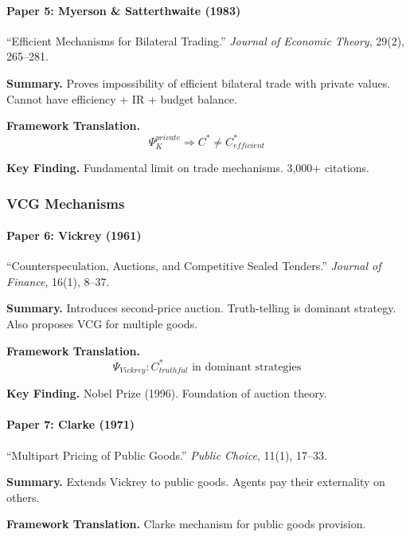 \paragraph{Paper 5: Myerson \& Satterthwaite (1983)}

``Efficient Mechanisms for Bilateral Trading.''
\textit{Journal of Economic Theory}, 29(2), 265--281.

\textbf{Summary.}
Proves impossibility of efficient bilateral trade with private values.
Cannot have efficiency + IR + budget balance.

\textbf{Framework Translation.}
\begin{equation}
\Psi_K^{private} \Rightarrow C^* \neq C^*_{efficient}
\end{equation}

\textbf{Key Finding.}
Fundamental limit on trade mechanisms. 3,000+ citations.

\subsubsection{VCG Mechanisms}

\paragraph{Paper 6: Vickrey (1961)}

``Counterspeculation, Auctions, and Competitive Sealed Tenders.''
\textit{Journal of Finance}, 16(1), 8--37.

\textbf{Summary.}
Introduces second-price auction. Truth-telling is dominant strategy.
Also proposes VCG for multiple goods.

\textbf{Framework Translation.}
\begin{equation}
\Psi_{Vickrey}: C^*_{truthful} \text{ in dominant strategies}
\end{equation}

\textbf{Key Finding.}
Nobel Prize (1996). Foundation of auction theory.

\paragraph{Paper 7: Clarke (1971)}

``Multipart Pricing of Public Goods.''
\textit{Public Choice}, 11(1), 17--33.

\textbf{Summary.}
Extends Vickrey to public goods. Agents pay their externality on others.

\textbf{Framework Translation.}
Clarke mechanism for public goods provision.

